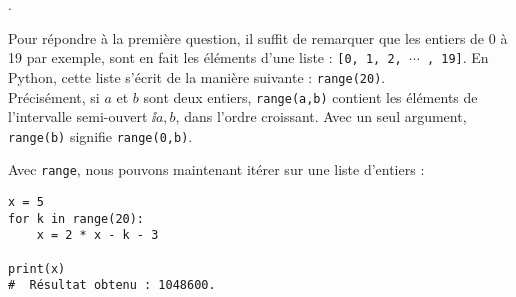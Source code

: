 .

Pour répondre à la première question, il suffit de remarquer que les entiers de 0 à 19 par exemple, 
sont en fait les éléments d'une liste : \texttt{[0, 1, 2, $\cdots$ , 19]}. En Python, cette liste 
s'écrit de la manière suivante : \texttt{range(20)}.\\
Précisément, si $a$ et $b$ sont deux entiers, \texttt{range(a,b)} contient les éléments de 
l'intervalle semi-ouvert $\ii{a,b}$, dans l'ordre croissant. Avec un seul argument, 
\texttt{range(b)} signifie \texttt{range(0,b)}.\\



  
  
Avec \texttt{range}, nous pouvons maintenant itérer sur une liste d'entiers :

\begin{lstlisting}
x = 5
for k in range(20):
    x = 2 * x - k - 3
  
print(x)
#  Résultat obtenu : 1048600.
\end{lstlisting}

%

